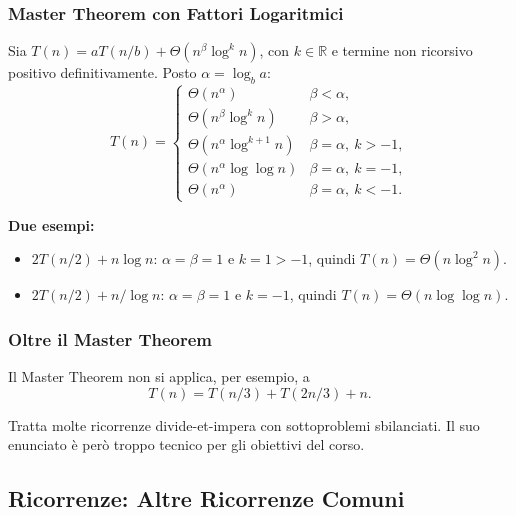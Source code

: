 \documentclass[12pt, a4paper]{article}
\begin{document}
\subsubsection{Master Theorem con Fattori Logaritmici}

\begin{tcolorbox}[colback=lightergray!10, colframe=tocsec, title=\textbf{Estensione: Fattori Logaritmici}]
\label{teo:master-log}
Sia $T(n)=aT(n/b)+\Theta(n^\beta\log^k n)$, con $k\in\mathbb{R}$ e termine non ricorsivo positivo definitivamente. Posto $\alpha=\log_b a$:
$$T(n) = \begin{cases}
\Theta(n^\alpha) & \beta<\alpha, \\
\Theta(n^\beta\log^k n) & \beta>\alpha, \\
\Theta(n^\alpha\log^{k+1} n) & \beta=\alpha,\ k>-1, \\
\Theta(n^\alpha\log\log n) & \beta=\alpha,\ k=-1, \\
\Theta(n^\alpha) & \beta=\alpha,\ k<-1.
\end{cases}$$
\end{tcolorbox}

\textbf{Due esempi:}
\begin{itemize}
    \item $2T(n/2)+n\log n$: $\alpha=\beta=1$ e $k=1>-1$, quindi $T(n)=\Theta(n\log^2 n)$.
    \item $2T(n/2)+n/\log n$: $\alpha=\beta=1$ e $k=-1$, quindi $T(n)=\Theta(n\log\log n)$.
\end{itemize}

\subsubsection{Oltre il Master Theorem}

\begin{tcolorbox}[colback=lightergray!5, colframe=tocsubsec, title=\textbf{Sottoproblemi di Dimensioni Diverse}]
Il Master Theorem non si applica, per esempio, a
$$T(n) = T(n/3)+T(2n/3)+n.$$
\end{tcolorbox}

\begin{tcolorbox}[colback=lightergray!10, colframe=tocsec, title=\textbf{Teorema di Akra--Bazzi}]
Tratta molte ricorrenze divide-et-impera con sottoproblemi sbilanciati. Il suo enunciato è però troppo tecnico per gli obiettivi del corso.
\end{tcolorbox}

\subsection{Ricorrenze: Altre Ricorrenze Comuni}
\label{sec:altre-ricorrenze}
\end{document}
